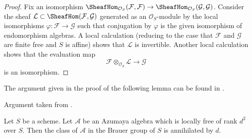 \begin{proof}
Fix an isomorphism
$\SheafHom_{\mathcal{O}_S}(\mathcal{F}, \mathcal{F}) \to
\SheafHom_{\mathcal{O}_S}(\mathcal{G}, \mathcal{G})$.
Consider the sheaf $\mathcal{L} \subset \SheafHom(\mathcal{F}, \mathcal{G})$
generated as an $\mathcal{O}_S$-module by the local isomorphisms
$\varphi : \mathcal{F} \to \mathcal{G}$ such that conjugation by
$\varphi$ is the given isomorphism of endomorphism algebras.
A local calculation (reducing to the case that $\mathcal{F}$ and $\mathcal{G}$
are finite free and $S$ is affine) shows that $\mathcal{L}$ is invertible.
Another local calculation shows that the evaluation map
$$
\mathcal{F} \otimes_{\mathcal{O}_S} \mathcal{L} \longrightarrow \mathcal{G}
$$
is an isomorphism.
\end{proof}

\noindent
The argument given in the proof of the following lemma can be found in
\cite{Saltman-torsion}.

\begin{lemma}
\label{lemma-annihilated-by-degree}
\begin{reference}
Argument taken from \cite{Saltman-torsion}.
\end{reference}
Let $S$ be a scheme. Let $\mathcal{A}$ be an Azumaya algebra which is
locally free of rank $d^2$ over $S$. Then the class
of $\mathcal{A}$ in the Brauer group of $S$ is annihilated by $d$.
\end{lemma}

